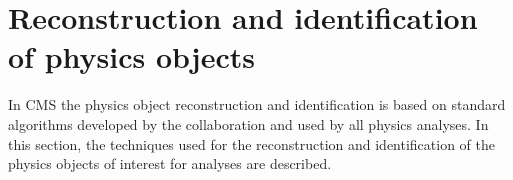 \chapter{Reconstruction and identification of physics objects}\label{chap3}
\thispagestyle{empty}

In CMS the physics object reconstruction and identification is based on standard algorithms developed by the collaboration and used by all physics analyses. In this section, the techniques used for the reconstruction and identification of the physics objects of interest for \hwwllnn analyses are described.






